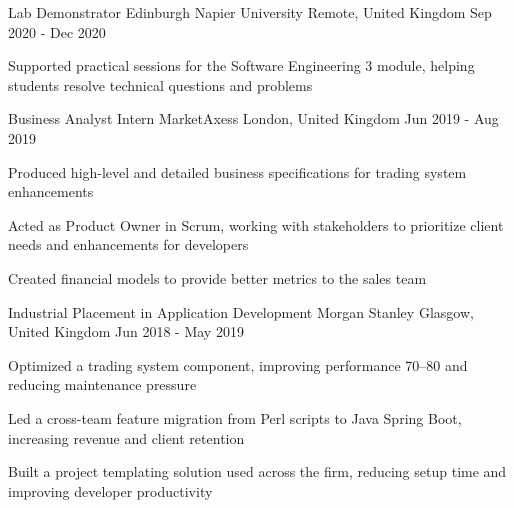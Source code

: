 \begin{cventries}
  \cventry
    {Lab Demonstrator}
    {Edinburgh Napier University}
    {Remote, United Kingdom}
    {Sep 2020 - Dec 2020}
    {
      \begin{cvitems}
        \item {Supported practical sessions for the Software Engineering 3 module, helping students resolve technical questions and problems}
      \end{cvitems}
    }

  \cventry
    {Business Analyst Intern}
    {MarketAxess}
    {London, United Kingdom}
    {Jun 2019 - Aug 2019}
    {
      \begin{cvitems}
        \item {Produced high-level and detailed business specifications for trading system enhancements}
        \item {Acted as Product Owner in Scrum, working with stakeholders to prioritize client needs and enhancements for developers}
        \item {Created financial models to provide better metrics to the sales team}
      \end{cvitems}
    }

  \cventry
    {Industrial Placement in Application Development}
    {Morgan Stanley}
    {Glasgow, United Kingdom}
    {Jun 2018 - May 2019}
    {
      \begin{cvitems}
        \item {Optimized a trading system component, improving performance 70--80\texttimes{} and reducing maintenance pressure}
        \item {Led a cross-team feature migration from Perl scripts to Java Spring Boot, increasing revenue and client retention}
        \item {Built a project templating solution used across the firm, reducing setup time and improving developer productivity}
      \end{cvitems}
    }

\end{cventries}
